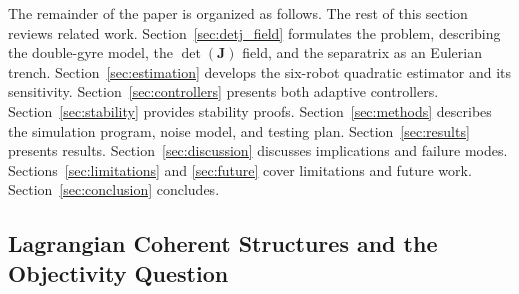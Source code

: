 \documentclass[lettersize,journal]{IEEEtran}
\begin{document}
The remainder of the paper is organized as follows. The rest of this
section reviews related work. Section~\ref{sec:detj_field} formulates the
problem, describing the double-gyre model, the $\det(\mathbf{J})$ field, and
the separatrix as an Eulerian trench.
Section~\ref{sec:estimation} develops the six-robot quadratic estimator
and its sensitivity. Section~\ref{sec:controllers} presents both adaptive
controllers.
Section~\ref{sec:stability} provides stability proofs.
Section~\ref{sec:methods} describes the simulation program, noise model, and
testing plan. Section~\ref{sec:results} presents results.
Section~\ref{sec:discussion} discusses implications and failure modes.
Sections~\ref{sec:limitations} and \ref{sec:future} cover limitations and
future work. Section~\ref{sec:conclusion} concludes.



\subsection{Lagrangian Coherent Structures and the Objectivity Question}
\end{document}

